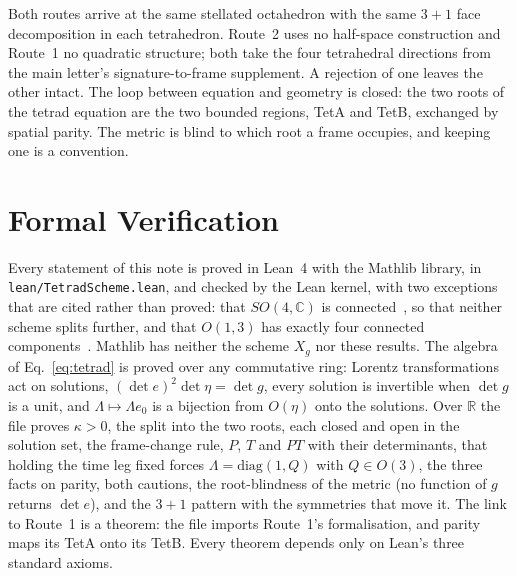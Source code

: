 \documentclass[twocolumn]{iopjournal}
\begin{document}
Both routes arrive at the same stellated octahedron with the same $3+1$ face decomposition in each tetrahedron. Route~2 uses no half-space construction and Route~1 no quadratic structure; both take the four tetrahedral directions from the main letter's signature-to-frame supplement. A rejection of one leaves the other intact. The loop between equation and geometry is closed: the two roots of the tetrad equation are the two bounded regions, TetA and TetB, exchanged by spatial parity. The metric is blind to which root a frame occupies, and keeping one is a convention.


\section*{Formal Verification}

Every statement of this note is proved in Lean~4 with the Mathlib library,
in \texttt{lean/TetradScheme.lean}, and checked by the Lean kernel, with
two exceptions that are cited rather than proved: that $SO(4,\mathbb{C})$
is connected~\cite{Borel1991}, so that neither scheme splits further, and
that $O(1,3)$ has exactly four connected components~\cite{Wald1984}.
Mathlib has neither the scheme $X_g$ nor these results. The algebra of
Eq.~\eqref{eq:tetrad} is proved over any commutative ring: Lorentz
transformations act on solutions, $(\det e)^2\det\eta = \det g$, every
solution is invertible when $\det g$ is a unit, and $\Lambda\mapsto\Lambda e_0$
is a bijection from $O(\eta)$ onto the solutions. Over $\mathbb{R}$ the file
proves $\kappa>0$, the split into the two roots, each closed and open in the
solution set, the frame-change rule, $P$, $T$ and $PT$ with their
determinants, that holding the time leg fixed forces $\Lambda=\mathrm{diag}(1,Q)$
with $Q\in O(3)$, the three facts on parity, both cautions, the
root-blindness of the metric (no function of $g$ returns $\det e$), and the
$3+1$ pattern with the symmetries that move it. The link to Route~1 is a
theorem: the file imports Route~1's formalisation, and parity maps its TetA
onto its TetB. Every theorem depends only on Lean's three standard axioms.

\end{document}
